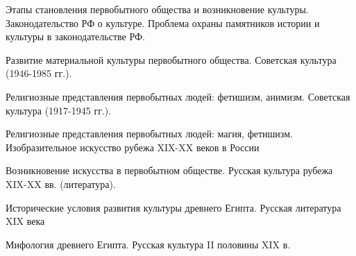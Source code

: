 \documentclass[
	14pt,
	a4paper,
	]
	{scrartcl}
\begin{document}
\shapk
{}
\setcounter{zad}{0}

\vfill
\z Этапы становления первобытного общества и возникновение культуры.
 \vfill
\z Законодательство РФ о культуре. Проблема охраны памятников истории и культуры в законодательстве РФ. \vfill

\vfill

\newpage


\shapk
{}
\setcounter{zad}{0}

\vfill
\z Развитие материальной культуры первобытного общества.
 \vfill
\z Советская культура (1946-1985 гг.).
 \vfill

\vfill

\newpage


\shapk
{}
\setcounter{zad}{0}

\vfill
\z Религиозные представления первобытных людей: фетишизм, анимизм.
 \vfill
\z Советская культура (1917-1945 гг.).
 \vfill

\vfill

\newpage


\shapk
{}
\setcounter{zad}{0}

\vfill
\z Религиозные представления первобытных людей: магия, фетишизм.
 \vfill
\z Изобразительное искусство рубежа XIX-XX веков в России
 \vfill

\vfill

\newpage


\shapk
{}
\setcounter{zad}{0}

\vfill
\z Возникновение искусства в первобытном обществе.
 \vfill
\z Русская культура рубежа XIX-XX вв. (литература).
 \vfill

\vfill

\newpage


\shapk
{}
\setcounter{zad}{0}

\vfill
\z Исторические условия развития культуры древнего Египта.
 \vfill
\z Русская литература XIX века
 \vfill

\vfill

\newpage


\shapk
{}
\setcounter{zad}{0}

\vfill
\z Мифология древнего Египта.
 \vfill
\z Русская культура II половины XIX в.
 \vfill

\vfill

\newpage


\shapk
{}
\setcounter{zad}{0}
\end{document}
